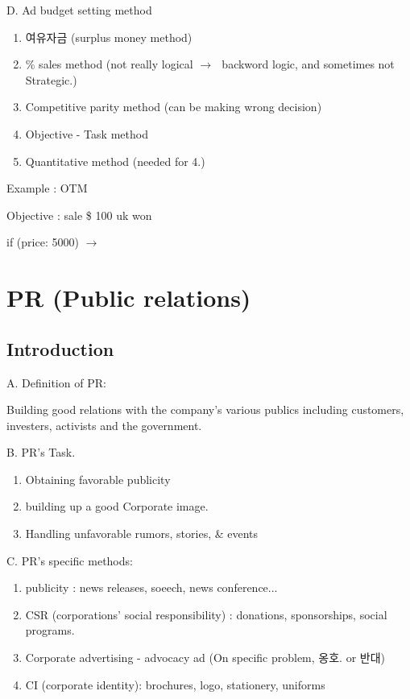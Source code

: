 \documentclass[12pt]{article}
\newcommand{\ra}{$\rightarrow \text{ }$}
\begin{document}
\begin{itemize}
D. Ad budget setting method

\begin{enumerate}
	\item 여유자금 (surplus money method)
	\item \% sales method (not really logical \ra backword logic, and sometimes not Strategic.)
	\item Competitive parity method (can be making wrong decision)
	\item Objective - Task method
	\item Quantitative method (needed for 4.)
\end{enumerate}



Example : OTM

Objective : sale \$ 100 uk won

if (price: 5000) \ra


\section{PR (Public relations)}

\subsection{Introduction}

A. Definition of PR:

Building good relations with the company's various publics including customers, investers, activists and the government.

B. PR's Task.
\begin{enumerate}
	\item Obtaining favorable publicity
	\item building up a good Corporate image.
	\item Handling unfavorable rumors, stories, & events
\end{enumerate}

C. PR's specific methods:

\begin{enumerate}
	\item publicity : news releases, soeech, news conference...
	\item CSR (corporations' social responsibility) : donations, sponsorships, social programs.
	\item Corporate advertising - advocacy ad (On specific problem, 옹호. or 반대)
	\item CI (corporate identity): brochures, logo, stationery, uniforms
\end{enumerate}


\end{itemize}
\end{document}
